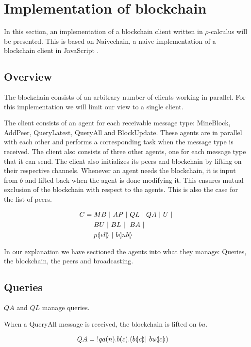 \section{Implementation of blockchain}
In this section, an implementation of a blockchain client written in $\rho$-calculus will be presented.
This is based on Naivechain, a naive implementation of a blockchain client in JavaScript \cite{naivechain}.

\subsection{Overview}

The blockchain consists of an arbitrary number of clients working in parallel. For this implementation we will limit our view to a single client.

The client consists of an agent for each receivable message type: MineBlock, AddPeer, QueryLatest, QueryAll and BlockUpdate.
These agents are in parallel with each other and performs a corresponding task when the message type is received.
The client also consists of three other agents, one for each message type that it can send.
The client also initializes its peers and blockchain by lifting on their respective channels.
Whenever an agent needs the blockchain, it is input from $b$ and lifted back when the agent is done modifying it.
This ensures mutual exclusion of the blockchain with respect to the agents.
This is also the case for the list of peers.

\begin{align*}
    C &= MB\ |\ AP\ |\ QL\ |\ QA\ |\ U\ |\\
    &\quad \ BU\ |\ BL\ |\ \ BA\ |\\
    &\quad \ p \langle \! | el | \! \rangle\ |\ b \langle \! | nb | \! \rangle
\end{align*}

In our explanation we have sectioned the agents into what they manage: Queries, the blockchain, the peers and broadcasting.

\subsection{Queries}

$QA$ and $QL$ manage queries.

When a QueryAll message is received, the blockchain is lifted on $bu$.

\begin{align*}
    QA &=\ !qa(n).b(c).(b \langle \! | c | \! \rangle| \ bu \langle \! | c | \! \rangle)
\end{align*}

